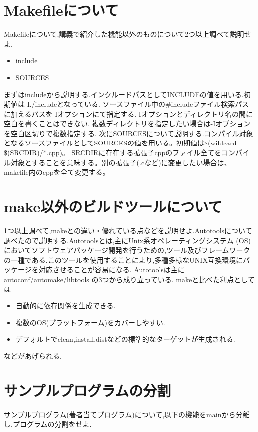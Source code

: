 \documentclass{jarticle}
\begin{document}
\section{Makefileについて}
Makefileについて,講義で紹介した機能以外のものについて2つ以上調べて説明せよ.


\begin{itemize}

\item include
\item SOURCES

\end{itemize}
まずはincludeから説明する.インクルードパスとしてINCLUDEの値を用いる.初期値は-I./includeとなっている. ソースファイル中の#includeファイル検索パスに加えるパスを-Iオプションにて指定する.-Iオプションとディレクトリ名の間に空白を書くことはできない. 複数ディレクトリを指定したい場合は-Iオプションを空白区切りで複数指定する.
次にSOURCESについて説明する.コンパイル対象となるソースファイルとしてSOURCESの値を用いる。初期値は\$(wildcard \$(SRCDIR)/*.cpp)。 SRCDIRに存在する拡張子cppのファイル全てをコンパイル対象とすることを意味する。別の拡張子(.cなど)に変更したい場合は、makefile内のcppを全て変更する。

\section{make以外のビルドツールについて}
1つ以上調べて,makeとの違い・優れている点などを説明せよ.Autotoolsについて調べたので説明する.Autotoolsとは,主にUnix系オペレーティングシステム (OS) においてソフトウェアパッケージ開発を行うための,ツール及びフレームワークの一種である.このツールを使用することにより,多種多様なUNIX互換環境にパッケージを対応させることが容易になる. Autotoolsは主に autoconf/automake/libtools の3つから成り立っている.
makeと比べた利点としては

\begin{itemize}

\item 自動的に依存関係を生成できる.
\item 複数のOS(プラットフォーム)をカバーしやすい.
\item デフォルトでclean,install,distなどの標準的なターゲットが生成される.

\end{itemize}

などがあげられる.

\section{サンプルプログラムの分割}
サンプルプログラム(著者当てプログラム)について,以下の機能をmainから分離し,プログラムの分割をせよ.
\end{document}
